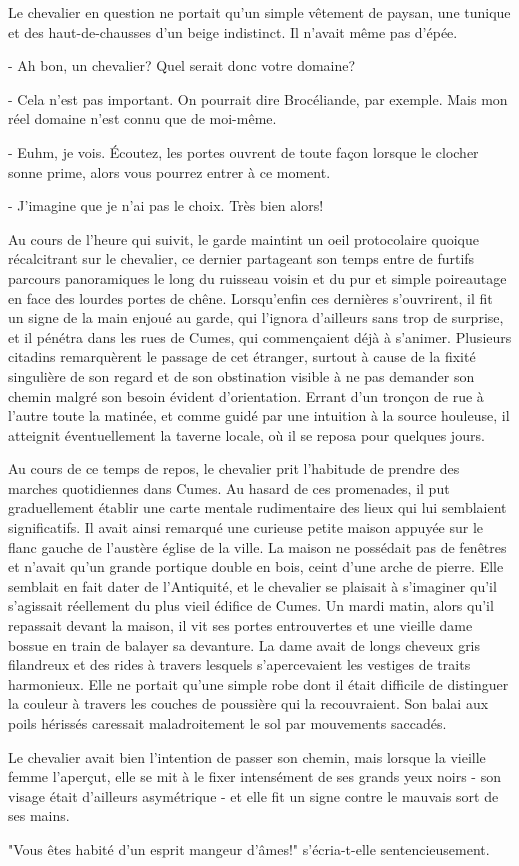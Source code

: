 \documentclass[a4paper,11pt, openany]{book}
\begin{document}
Le chevalier en question ne portait qu'un simple vêtement de paysan, une tunique et des haut-de-chausses d'un beige indistinct. Il n'avait même pas d'épée.

- Ah bon, un chevalier? Quel serait donc votre domaine?

- Cela n'est pas important. On pourrait dire Brocéliande, par exemple. Mais mon réel domaine n'est connu que de moi-même.

- Euhm, je vois. Écoutez, les portes ouvrent de toute façon lorsque le clocher sonne prime, alors vous pourrez entrer à ce moment.

- J'imagine que je n'ai pas le choix. Très bien alors!

Au cours de l'heure qui suivit, le garde maintint un oeil protocolaire quoique récalcitrant sur le chevalier, ce dernier partageant son temps entre de furtifs parcours panoramiques le long du ruisseau voisin et du pur et simple poireautage en face des lourdes portes de chêne.
Lorsqu'enfin ces dernières s'ouvrirent, il fit un signe de la main enjoué au garde, qui l'ignora d'ailleurs sans trop de surprise, et il pénétra dans les rues de Cumes, qui commençaient déjà à s'animer.
Plusieurs citadins remarquèrent le passage de cet étranger, surtout à cause de la fixité singulière de son regard et de son obstination visible à ne pas demander son chemin malgré son besoin évident d'orientation.
Errant d'un tronçon de rue à l'autre toute la matinée, et comme guidé par une intuition à la source houleuse, il atteignit éventuellement la taverne locale, où il se reposa pour quelques jours.

Au cours de ce temps de repos, le chevalier prit l'habitude de prendre des marches quotidiennes dans Cumes. Au hasard de ces promenades, il put graduellement établir une carte mentale rudimentaire des lieux qui lui semblaient significatifs. 
Il avait ainsi remarqué une curieuse petite maison appuyée sur le flanc gauche de l'austère église de la ville. La maison ne possédait pas de fenêtres et n'avait qu'un grande portique double en bois, ceint d'une arche de pierre. Elle semblait en fait dater de l'Antiquité,
et le chevalier se plaisait à s'imaginer qu'il s'agissait réellement du plus vieil édifice de Cumes. Un mardi matin, alors qu'il repassait devant la maison, il vit ses portes entrouvertes et une vieille dame bossue en train de balayer sa devanture.
La dame avait de longs cheveux gris filandreux et des rides à travers lesquels s'apercevaient les vestiges de traits harmonieux. Elle ne portait qu'une simple robe dont il était difficile de distinguer la couleur à travers les couches de poussière qui la recouvraient. 
Son balai aux poils hérissés caressait maladroitement le sol par mouvements saccadés.

Le chevalier avait bien l'intention de passer son chemin, mais lorsque la vieille femme l'aperçut, elle se mit à le fixer intensément de ses grands yeux noirs - son visage était d'ailleurs asymétrique - et elle fit un signe contre le mauvais sort de ses mains.

"Vous êtes habité d'un esprit mangeur d'âmes!" s'écria-t-elle sentencieusement.
\end{document}
